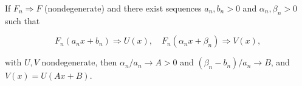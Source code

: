 If $F_n \Rightarrow F$ (nondegenerate) and there exist sequences $a_n, b_n > 0$ and $\alpha_n, \beta_n > 0$ such that

$$F_n(a_n x + b_n) \Rightarrow U(x), \quad F_n(\alpha_n x + \beta_n) \Rightarrow V(x),$$

with $U, V$ nondegenerate, then $\alpha_n/a_n \to A > 0$ and $(\beta_n - b_n)/a_n \to B$, and $V(x) = U(Ax + B)$.
